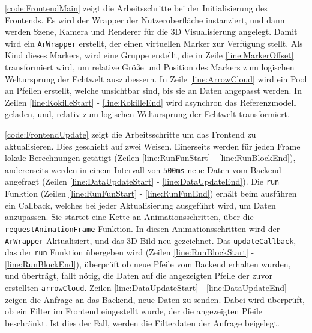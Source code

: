 \pagebreak

\lstlistingname\space \ref{code:FrontendMain} zeigt die Arbeitsschritte bei der
Initialisierung des Frontends. Es wird der Wrapper der Nutzeroberfläche
instanziert, und dann werden Szene, Kamera und Renderer für die
3D Visualisierung angelegt. Damit wird ein \texttt{ArWrapper}
erstellt, der einen virtuellen Marker zur Verfügung stellt.
Als Kind dieses Markers, wird eine Gruppe erstellt, die in Zeile
\ref{line:MarkerOffset} transformiert wird, um relative Größe und
Position des Markers zum logischen Weltursprung der Echtwelt auszubessern.
In Zeile \ref{line:ArrowCloud} wird ein Pool an Pfeilen erstellt,
welche unsichtbar sind, bis sie an Daten angepasst werden.
In Zeilen \ref{line:KokilleStart} - \ref{line:KokilleEnd} wird
asynchron das Referenzmodell geladen, und, relativ zum
logischen Weltursprung der Echtwelt transformiert.

\lstlistingname\space \ref{code:FrontendUpdate} zeigt die Arbeitsschritte um das Frontend
zu aktualisieren. Dies geschieht auf zwei Weisen. Einerseits werden für
jeden Frame lokale Berechnungen getätigt (Zeilen \ref{line:RunFunStart} -
\ref{line:RunBlockEnd}), andererseits werden in einem Intervall von
\texttt{500ms} neue Daten vom Backend angefragt (Zeilen
\ref{line:DataUpdateStart} - \ref{line:DataUpdateEnd}).
Die \texttt{run} Funktion (Zeilen \ref{line:RunFunStart} -
\ref{line:RunFunEnd}) erhält beim ausführen ein Callback, welches
bei jeder Aktualisierung ausgeführt wird, um Daten anzupassen.
Sie startet eine Kette an Animationsschritten, über die
\texttt{requestAnimationFrame} Funktion. In diesen Animationsschritten
wird der \texttt{ArWrapper} Aktualisiert, und das 3D-Bild neu gezeichnet.
Das \texttt{updateCallback}, das der \texttt{run} Funktion übergeben
wird (Zeilen \ref{line:RunBlockStart} - \ref{line:RunBlockEnd}),
überprüft ob neue Pfeile vom Backend erhalten wurden, und überträgt,
fallt nötig, die Daten auf die angezeigten Pfeile der zuvor
erstellten \texttt{arrowCloud}.
Zeilen \ref{line:DataUpdateStart} - \ref{line:DataUpdateEnd} zeigen die
Anfrage an das Backend, neue Daten zu senden. Dabei wird überprüft,
ob ein Filter im Frontend eingestellt wurde, der die angezeigten
Pfeile beschränkt. Ist dies der Fall, werden die Filterdaten der
Anfrage beigelegt.

